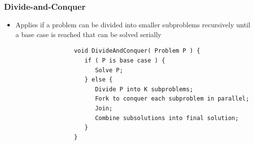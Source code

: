\documentclass[xcolor=dvipsnames]{beamer}
\begin{document}
		\begin{frame}[fragile] \frametitle{Divide-and-Conquer}
			\begin{itemize}
				\item Applies if a problem can be divided into smaller 
                subproblems recursively until a base case is reached that can
                be solved serially
			\end{itemize}
				\begin{verbatim}
					void DivideAndConquer( Problem P ) {
					   if ( P is base case ) {
					      Solve P;
					   } else {
					      Divide P into K subproblems;
					      Fork to conquer each subproblem in parallel;
					      Join;
					      Combine subsolutions into final solution;
					   }
					}
				\end{verbatim}
		\end{frame}
\end{document}
